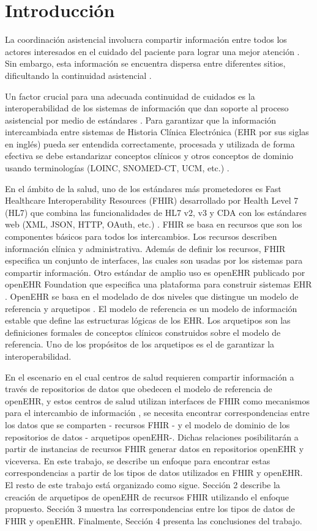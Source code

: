 \section{Introducción}

La coordinación asistencial involucra compartir información entre todos los actores interesados en el cuidado del paciente para lograr una mejor atención \cite{CareCoordination}. Sin embargo, esta información se encuentra dispersa entre diferentes sitios, dificultando la continuidad asistencial \cite{Indarte11}.

Un factor crucial para una adecuada continuidad de cuidados es la interoperabilidad de los sistemas de información que dan soporte al proceso asistencial por medio de estándares \cite{OPS16}. Para garantizar que la información intercambiada entre sistemas de Historia Clínica Electrónica (EHR por sus siglas en inglés) pueda ser entendida correctamente, procesada y utilizada de forma efectiva se debe estandarizar conceptos clínicos y otros conceptos de dominio usando terminologías (LOINC, SNOMED-CT, UCM, etc.) \cite{ISO20514}.

En el ámbito de la salud, uno de los estándares más prometedores es Fast Healthcare Interoperability Resources (FHIR) desarrollado por Health Level 7 (HL7) que combina las funcionalidades de HL7 v2, v3 y CDA con los estándares web (XML, JSON, HTTP, OAuth, etc.) \cite{FHIR}. FHIR se basa en recursos que son los componentes básicos para todos los intercambios. Los recursos describen información clínica y administrativa. Además de definir los recursos, FHIR especifica un conjunto de interfaces, las cuales son usadas por los sistemas para compartir información. Otro estándar de amplio uso es openEHR publicado por openEHR Foundation que especifica una plataforma para construir sistemas EHR \cite{openEHR}. OpenEHR se basa en el modelado de dos niveles que distingue un modelo de referencia y arquetipos \cite{Bale00}. El modelo de referencia es un modelo de información estable que define las estructuras lógicas de los EHR. Los arquetipos son las definiciones formales de conceptos clínicos construidos sobre el modelo de referencia. Uno de los propósitos de los arquetipos es el de garantizar la interoperabilidad.

En el escenario en el cual centros de salud requieren compartir información a través de repositorios de datos que obedecen el modelo de referencia de openEHR, y estos centros de salud utilizan interfaces de FHIR como mecanismos para el intercambio de información \cite{Lopez16}, se necesita encontrar correspondencias entre los datos que se comparten - recursos FHIR - y el modelo de dominio de los repositorios de datos - arquetipos openEHR-. Dichas relaciones posibilitarán a partir de instancias de recursos FHIR generar datos en repositorios openEHR y viceversa. En este trabajo, se describe un enfoque para encontrar estas correspondencias a partir de los tipos de datos utilizados en FHIR y openEHR. El resto de este trabajo está organizado como sigue. Sección 2 describe la creación de arquetipos de openEHR de recursos FHIR utilizando el enfoque propuesto. Sección 3 muestra las correspondencias entre los tipos de datos de FHIR y openEHR. Finalmente, Sección 4 presenta las conclusiones del trabajo.
